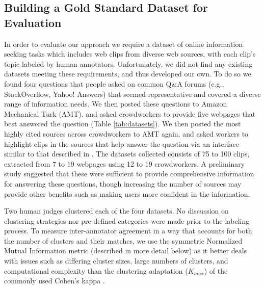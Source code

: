 
\subsection{Building a Gold Standard Dataset for Evaluation}

In order to evaluate our approach we require a dataset of online information
seeking tasks which includes web clips from diverse web sources, with each
clip's topic labeled by human annotators. Unfortunately, we did not find any
existing datasets meeting these requirements, and thus developed our own. To do
so we found four questions that people asked on common Q\&A forums (e.g.,
StackOverflow, Yahoo! Answers) that seemed representative and covered a diverse
range of information needs. We then posted these questions to Amazon Mechanical
Turk (AMT), and asked crowdworkers to provide five webpages that best answered
the question (Table \ref{tab:datasets}). We then posted the most highly cited
sources across crowdworkers to AMT again, and asked workers to highlight clips
in the sources that help answer the question via an interface similar to that
described in \cite{kittur2013costs}.  The datasets collected consists of 75 to
100 clips, extracted from 7 to 19 webpages using 12 to 19 crowdworkers. A
preliminary study suggested that these were sufficient to provide comprehensive
information for answering these questions, though increasing the number of
sources may provide other benefits such as making users more confident in the
information. 

Two human judges clustered each of the four datasets. No discussion on
clustering strategies nor pre-defined categories were made prior to the
labeling process.  To measure inter-annotator agreement in a way that accounts for
both the number of clusters and their matches, we use the symmetric Normalized
Mutual Information metric (described in more detail below) as it better deals
with issues such as differing cluster sizes, large numbers of clusters, and
computational complexity than the clustering adaptation ($K_{max}$) of the
commonly used Cohen's kappa \cite{manning2008introduction,reilly2005rapid}. 

